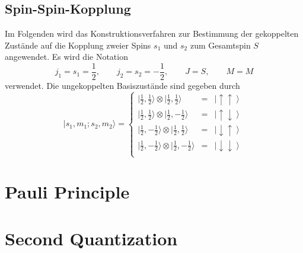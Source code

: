 \documentclass[9pt]{report}
\begin{document}
\subsection{Spin-Spin-Kopplung}
Im Folgenden wird das Konstruktionsverfahren zur Bestimmung der gekoppelten Zustände auf die Kopplung zweier Spins $s_1$ und $s_2$ zum Gesamtspin $S$ angewendet. Es wird die Notation
\begin{equation}
j_1 = s_1 = \frac{1}{2},\qquad j_2 = s_2 = -\frac{1}{2},\qquad J = S,\qquad M = M
\end{equation}
verwendet. Die ungekoppelten Basiszustände sind gegeben durch
\begin{equation}
\renewcommand{\arraystretch}{1.6}
\big|s_1,m_1;s_2,m_2\big\rangle=\left\{\begin{array}{ccc} \big|\frac{1}{2},\frac{1}{2}\big\rangle\otimes\big|\frac{1}{2},\frac{1}{2}\big\rangle&=&\left|\uparrow\uparrow\right\rangle\\
\big|\frac{1}{2},\frac{1}{2}\big\rangle\otimes\big|\frac{1}{2},-\frac{1}{2}\big\rangle&=&\left|\uparrow\downarrow\right\rangle\\
\big|\frac{1}{2},-\frac{1}{2}\big\rangle\otimes\big|\frac{1}{2},\frac{1}{2}\big\rangle&=&\left|\downarrow\uparrow\right\rangle\\
\big|\frac{1}{2},-\frac{1}{2}\big\rangle\otimes\big|\frac{1}{2},-\frac{1}{2}\big\rangle&=&\left|\downarrow\downarrow\right\rangle\\ \end{array}\right.
\end{equation}


\section{Pauli Principle}

\section{Second Quantization}
\end{document}

